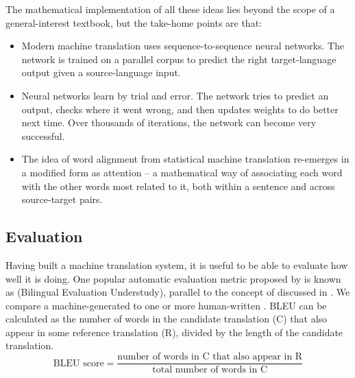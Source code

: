 The mathematical implementation of all these ideas lies beyond the scope of a general-interest textbook, but the take-home points are that:

\begin{itemize}

\item Modern machine translation uses sequence-to-sequence neural networks.  The network is trained on a parallel corpus to predict the right target-language output given a source-language input.

\item Neural networks learn by trial and error.  The network tries to predict an output, checks where it went wrong, and then updates weights to do better next time.  Over thousands of iterations, the network can become very successful.

\item The idea of word alignment from statistical machine translation re-emerges in a modified form as attention -- a mathematical way of associating each word with the other words most related to it, both within a sentence and across source-target pairs.

\end{itemize}



\subsection{Evaluation}

Having built a machine translation system, it is useful to be able to evaluate how well it is doing.  
One popular automatic evaluation metric proposed by \citet{Papineni-etal:2002} is known as  (Bilingual Evaluation Understudy), parallel to the concept of  discussed in .  We compare a machine-generated  to one or more human-written .  BLEU can be calculated as the number of words in the candidate translation (C) that also appear in some  reference translation (R), divided by the length of the candidate translation. 
\begin{equation}
\mbox{BLEU score} = \frac{\mbox{number of words in C that also appear in R}}{\mbox{total number of words in C}}
\end{equation}

